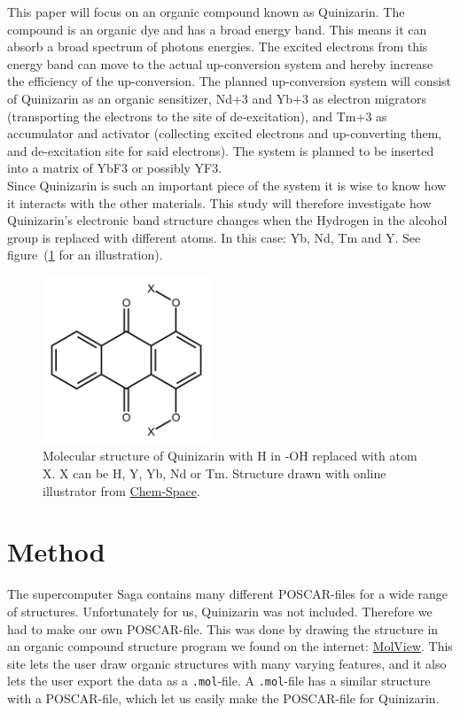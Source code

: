 \documentclass{article}
\begin{document}
    This paper will focus on an organic compound known as Quinizarin. The compound is an organic dye and has a broad energy band. This means it can absorb a broad spectrum of photons energies. The excited electrons from this energy band can move to the actual up-conversion system and hereby increase the efficiency of the up-conversion. The planned up-conversion system will consist of Quinizarin as an organic sensitizer, Nd+3 and Yb+3 as electron migrators (transporting the electrons to the site of de-excitation), and Tm+3 as accumulator and activator (collecting excited electrons and up-converting them, and de-excitation site for said electrons). The system is planned to be inserted into a matrix of YbF3 or possibly YF3.\\

    Since Quinizarin is such an important piece of the system it is wise to know how it interacts with the other materials. This study will therefore investigate how Quinizarin's electronic band structure changes when the Hydrogen in the alcohol group is replaced with different atoms. In this case: Yb, Nd, Tm and Y. See figure~(\ref{fig:Quinizarin-X} for an illustration).\\

    \begin{figure}[H]
        \centering
        \includegraphics[width = 5cm]{../fig/quinizarin-x.png}
        \caption{Molecular structure of Quinizarin with H in -OH replaced with atom X. X can be H, Y, Yb, Nd or Tm. Structure drawn with online illustrator from \href{https://chem-space.com/search}{Chem-Space}.}
        \label{fig:Quinizarin-X}
    \end{figure}

\vspace{1cm}

\section{Method}    \label{sec:Method}

  The supercomputer Saga contains many different POSCAR-files for a wide range of structures. Unfortunately for us, Quinizarin was not included. Therefore we had to make our own POSCAR-file. This was done by drawing the structure in an organic compound structure program we found on the internet: \href{https://molview.org}{MolView}. This site lets the user draw organic structures with many varying features, and it also lets the user export the data as a \texttt{.mol}-file. A \texttt{.mol}-file has a similar structure with a POSCAR-file, which let us easily make the POSCAR-file for Quinizarin. \\
\end{document}
